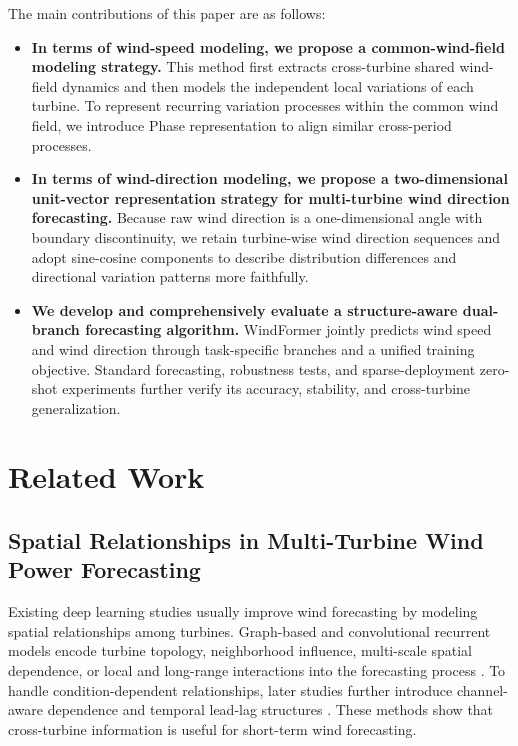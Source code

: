 The main contributions of this paper are as follows:

\begin{itemize}
	\item \textbf{In terms of wind-speed modeling, we propose a common-wind-field modeling strategy.} This method first extracts cross-turbine shared wind-field dynamics and then models the independent local variations of each turbine. To represent recurring variation processes within the common wind field, we introduce Phase representation to align similar cross-period processes.
    \item \textbf{In terms of wind-direction modeling, we propose a two-dimensional unit-vector representation strategy for multi-turbine wind direction forecasting.} Because raw wind direction is a one-dimensional angle with boundary discontinuity, we retain turbine-wise wind direction sequences and adopt sine-cosine components to describe distribution differences and directional variation patterns more faithfully.
    \item \textbf{We develop and comprehensively evaluate a structure-aware dual-branch forecasting algorithm.} WindFormer jointly predicts wind speed and wind direction through task-specific branches and a unified training objective. Standard forecasting, robustness tests, and sparse-deployment zero-shot experiments further verify its accuracy, stability, and cross-turbine generalization.
\end{itemize}

\section{Related Work}
\label{sec:related_work}

\subsection{Spatial Relationships in Multi-Turbine Wind Power Forecasting}

Existing deep learning studies usually improve wind forecasting by modeling spatial relationships among turbines. Graph-based and convolutional recurrent models encode turbine topology, neighborhood influence, multi-scale spatial dependence, or local and long-range interactions into the forecasting process \cite{Song2023ShortTermForecastingGraphConvolutionWindPower,Zhang2019LSTMNeighborhoodGatesCausalityWindSpeed,Wu2024MixFormerHierarchicalContextWindSpeed}. To handle condition-dependent relationships, later studies further introduce channel-aware dependence and temporal lead-lag structures \cite{Zhao2024RethinkingChannelDependenceLeadingIndicators,Zhu2024GGNetTemporalLeadLagCorrelations}. These methods show that cross-turbine information is useful for short-term wind forecasting.

